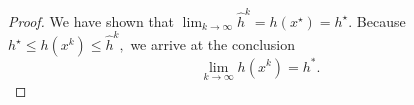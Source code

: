 \documentclass{amsart}
\newcommand{\opt}{^\star}
\theoremstyle{definition}
\begin{document}
\begin{proof}
    We have shown that $\lim_{k\to\infty} \hat h^k = h(x\opt) =  h\opt.$ Because $h\opt \le h(x^k)\le \hat h^k,$ we arrive at the conclusion 
     $$\lim_{k\to\infty} h(x^k) = h^*.$$
    
    \end{proof}




\end{document}
